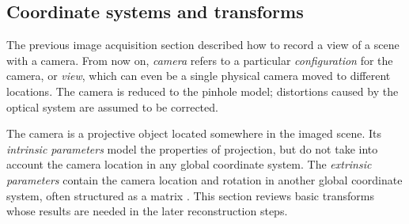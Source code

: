 


\subsection{Coordinate systems and transforms} \label{sec:coord} %


The previous image acquisition section described how to record a view of a scene with a camera.
From now on, \emph{camera} refers to a particular \emph{configuration} for the camera, or \emph{view}, which can even be a single physical camera moved to different locations.
The camera is reduced to the pinhole model; distortions caused by the optical system are assumed to be corrected.


The camera is a projective object located somewhere in the imaged scene.
Its \emph{intrinsic parameters} model the properties of projection, but do not take into account the camera location in any global coordinate system.
The \emph{extrinsic parameters} contain the camera location and rotation in another global coordinate system, often structured as a matrix \cite[p. 41]{hartley03multiview}. %
This section reviews basic transforms whose results are needed in the later reconstruction steps.


